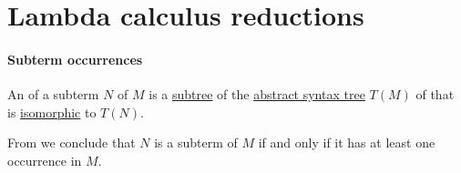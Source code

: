 \section{Lambda calculus reductions}\label{sec:lambda_calculus_reductions}

\paragraph{Subterm occurrences}

\begin{definition}\label{def:lambda_subterm_occurrence}\mimprovised
  An  of a subterm \( N \) of \( M \) is a \hyperref[def:tree/subtree]{subtree} of the \hyperref[con:abstract_syntax_tree]{abstract syntax tree} \( T(M) \) of that is \hyperref[def:labeled_tree/homomorphism]{isomorphic} to \( T(N) \).
\end{definition}
\begin{comments}
  \item From  we conclude that \( N \) is a subterm of \( M \) if and only if it has at least one occurrence in \( M \).
\end{comments}

